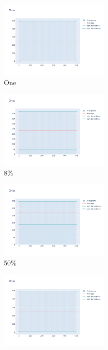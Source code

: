 \documentclass[12pt, fleqn]{report}                             %
\theoremstyle{break}                                            %
\begin{document}
      \begin{figure}[ht!]
        \centering
        \begin{subfigure}[b]{0.4\linewidth}
          \includegraphics[width=0.6\textwidth]{Images/3/dia-a.png}
          \caption{One}
        \end{subfigure}
        \begin{subfigure}[b]{0.4\linewidth}
          \includegraphics[width=0.6\textwidth]{Images/3/dia-b.png}
          \caption{8\%}
        \end{subfigure}
        \begin{subfigure}[b]{0.4\linewidth}
          \includegraphics[width=0.6\textwidth]{Images/3/dia-c.png}
          \caption{50\%}
        \end{subfigure}
        \begin{subfigure}[b]{0.4\linewidth}
          \includegraphics[width=0.6\textwidth]{Images/3/dia-d.png}

\end{subfigure}
\end{figure}
\end{document}
